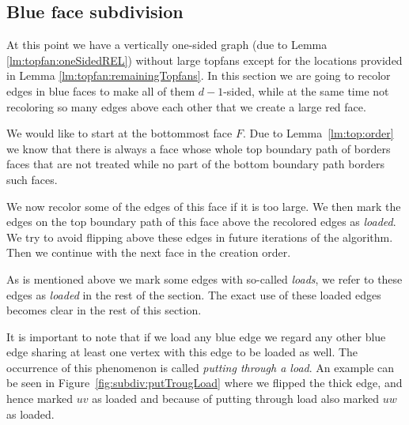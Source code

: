 
\subsection{Blue face subdivision}
\thispagestyle{plain}
\label{ss:subdiv}
  At this point we have a vertically one-sided graph (due to Lemma \ref{lm:topfan:oneSidedREL}) without large topfans except for the locations provided in Lemma \ref{lm:topfan:remainingTopfans}.
  In this section we are going to recolor edges in blue faces to make all of them $d-1$-sided, while at the same time not recoloring so many edges above each other that we create a large red face.

  We would like to start at the bottommost face $F$. Due to Lemma~\ref{lm:top:order} we know that there is always a face whose whole top boundary path of borders faces that are not treated while no part of the bottom boundary path borders such faces.

  We now recolor some of the edges of this face if it is too large.
  We then mark the edges on the top boundary path of this face above the recolored edges as \emph{loaded}.
  We try to avoid flipping above these edges in future iterations of the algorithm.
  Then we continue with the next face in the creation order.

  As is mentioned above we mark some edges with so-called \emph{loads}, we refer to these edges as \emph{loaded} in the rest of the section.
  The exact use of these loaded edges becomes clear in the rest of this section.

  It is important to note that if we load any blue edge we regard any other blue edge sharing at least one vertex with this edge to be loaded as well.
  The occurrence of this phenomenon is called \emph{putting through a load}.
  An example can be seen in Figure~\ref{fig:subdiv:putTrougLoad} where we flipped the thick edge, and hence marked $uv$ as loaded and because of putting through load also marked $uw$ as loaded.

